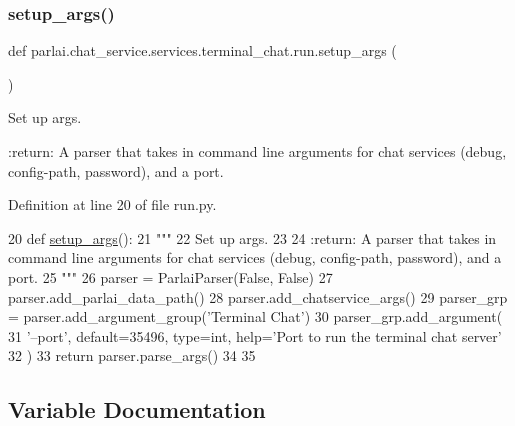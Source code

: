 \subsubsection{\texorpdfstring{setup\+\_\+args()}{setup\_args()}}
{\footnotesize\ttfamily def parlai.\+chat\+\_\+service.\+services.\+terminal\+\_\+chat.\+run.\+setup\+\_\+args (\begin{DoxyParamCaption}{ }\end{DoxyParamCaption})}

\begin{DoxyVerb}Set up args.

:return: A parser that takes in command line arguments for chat services (debug, config-path, password), and a port.
\end{DoxyVerb}
 

Definition at line 20 of file run.\+py.


\begin{DoxyCode}
20 \textcolor{keyword}{def }\hyperlink{namespaceparlai_1_1tasks_1_1talkthewalk_1_1run_a3534e8afa0a4dc25a6e02740fa35ac84}{setup\_args}():
21     \textcolor{stringliteral}{"""}
22 \textcolor{stringliteral}{    Set up args.}
23 \textcolor{stringliteral}{}
24 \textcolor{stringliteral}{    :return: A parser that takes in command line arguments for chat services (debug, config-path,
       password), and a port.}
25 \textcolor{stringliteral}{    """}
26     parser = ParlaiParser(\textcolor{keyword}{False}, \textcolor{keyword}{False})
27     parser.add\_parlai\_data\_path()
28     parser.add\_chatservice\_args()
29     parser\_grp = parser.add\_argument\_group(\textcolor{stringliteral}{'Terminal Chat'})
30     parser\_grp.add\_argument(
31         \textcolor{stringliteral}{'--port'}, default=35496, type=int, help=\textcolor{stringliteral}{'Port to run the terminal chat server'}
32     )
33     \textcolor{keywordflow}{return} parser.parse\_args()
34 
35 
\end{DoxyCode}


\subsection{Variable Documentation}
\mbox{\label{namespaceparlai_1_1chat__service_1_1services_1_1terminal__chat_1_1run_a4361047d588ccc6be7146ba6a063cd9f}} 
